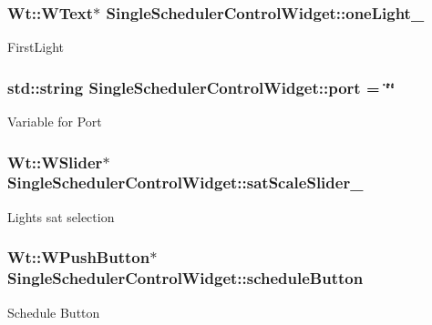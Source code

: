 \subsubsection[{\texorpdfstring{one\+Light\+\_\+}{oneLight_}}]{\setlength{\rightskip}{0pt plus 5cm}Wt\+::\+W\+Text$\ast$ Single\+Scheduler\+Control\+Widget\+::one\+Light\+\_\+\hspace{0.3cm}{\ttfamily [private]}}\hypertarget{classSingleSchedulerControlWidget_acfe14aa1c8dc0058376716cefc746dd9}{}\label{classSingleSchedulerControlWidget_acfe14aa1c8dc0058376716cefc746dd9}
First\+Light 
\subsubsection[{\texorpdfstring{port}{port}}]{\setlength{\rightskip}{0pt plus 5cm}std\+::string Single\+Scheduler\+Control\+Widget\+::port = \char`\"{}\char`\"{}\hspace{0.3cm}{\ttfamily [private]}}\hypertarget{classSingleSchedulerControlWidget_aa5647267c15e301af0a354f12c71d2af}{}\label{classSingleSchedulerControlWidget_aa5647267c15e301af0a354f12c71d2af}
Variable for Port 
\subsubsection[{\texorpdfstring{sat\+Scale\+Slider\+\_\+}{satScaleSlider_}}]{\setlength{\rightskip}{0pt plus 5cm}Wt\+::\+W\+Slider$\ast$ Single\+Scheduler\+Control\+Widget\+::sat\+Scale\+Slider\+\_\+\hspace{0.3cm}{\ttfamily [private]}}\hypertarget{classSingleSchedulerControlWidget_a777b6c22a218902cb4410c6019aeb485}{}\label{classSingleSchedulerControlWidget_a777b6c22a218902cb4410c6019aeb485}
Light\textquotesingle{}s sat selection 
\subsubsection[{\texorpdfstring{schedule\+Button}{scheduleButton}}]{\setlength{\rightskip}{0pt plus 5cm}Wt\+::\+W\+Push\+Button$\ast$ Single\+Scheduler\+Control\+Widget\+::schedule\+Button\hspace{0.3cm}{\ttfamily [private]}}\hypertarget{classSingleSchedulerControlWidget_ae8dd8c0b3020fcff9d237f5c16ab5396}{}\label{classSingleSchedulerControlWidget_ae8dd8c0b3020fcff9d237f5c16ab5396}
Schedule Button 

